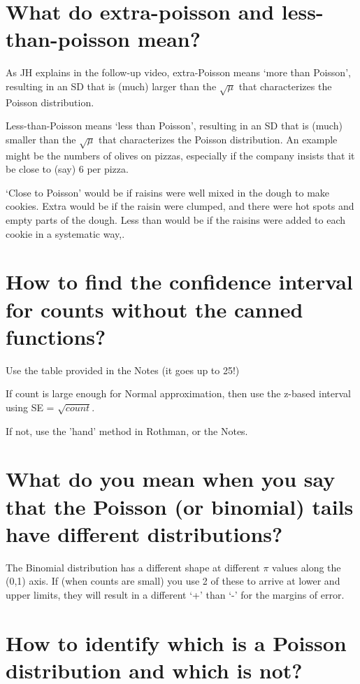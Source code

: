\documentclass[landscape,twocolumn,letterpaper,9pt,reqno]{article}
\begin{document}
\section{What do extra-poisson and less-than-poisson mean? }

As JH explains in the follow-up video, extra-Poisson means `more than Poisson', resulting in an SD that is (much) larger than the $\sqrt{\mu}$ that characterizes the Poisson distribution.

Less-than-Poisson means `less than Poisson', resulting in an SD that is (much) smaller than the $\sqrt{\mu}$ that characterizes the Poisson distribution. An example might be the numbers of olives on pizzas, especially if the company insists that it be close to (say) 6 per pizza. 

`Close to Poisson' would be if raisins were well mixed in the dough to make cookies. Extra would be if the raisin were clumped, and there were hot spots and empty parts of the dough. Less than would be if the raisins were added to each cookie in a systematic way,. 

\section{How to find the confidence interval for counts without the canned functions? }

Use the table provided in the Notes (it goes up to 25!)

If count is large enough for Normal approximation, then use the z-based interval using SE = $\sqrt{count}.$

If not, use the 'hand' method in Rothman, or the Notes.


\section{What do you mean when you say that the Poisson (or binomial) tails have different distributions?}

The Binomial distribution has a different shape at different $\pi$ values along the (0,1) axis. If (when counts are small) you use 2 of these to arrive at lower and upper limits, they will result in a different `+' than `-' for the margins of error.

\section{How to identify which is a Poisson distribution and which is not? }
\end{document}
